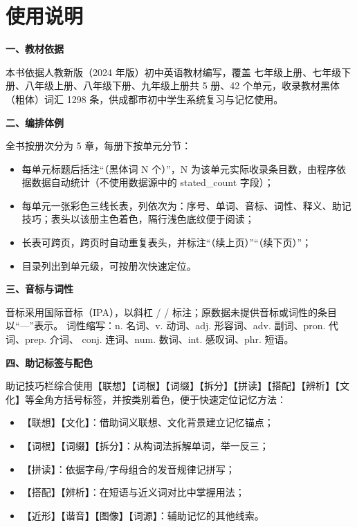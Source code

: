 \documentclass[UTF8,a4paper,11pt,oneside]{ctexbook}
\newcommand{\subhead}[1]{%
  \par\vspace{0.9em}%
  \noindent{\color{mainblue}\rule[-0.18em]{3.2pt}{1.25em}}\hspace{0.55em}%
  {\sffamily\bfseries\large\color{mainblue}#1}\par\vspace{0.28em}}
\begin{document}
\frontmatter
\pagestyle{plain}

\chapter*{使用说明}
{}
\vspace{-0.2em}
\noindent{\color{mainblue!35}\rule{\linewidth}{1.0pt}}\par
\vspace{0.7em}

\subhead{一、教材依据}
本书依据人教新版（2024 年版）初中英语教材编写，覆盖 七年级上册、七年级下册、八年级上册、八年级下册、九年级上册共 5 册、42 个单元，收录教材黑体（粗体）词汇 1298 条，供成都市初中学生系统复习与记忆使用。

\subhead{二、编排体例}
全书按册次分为 5 章，每册下按单元分节：
\begin{itemize}[leftmargin=2.2em,itemsep=0.25ex,topsep=0.3ex,
                label={\textcolor{mainblue}{\small\textbullet}}]
  \item 每单元标题后括注“（黑体词 N 个）”，N 为该单元实际收录条目数，由程序依据数据自动统计（不使用数据源中的 stated\_count 字段）；
  \item 每单元一张彩色三线长表，列依次为：序号、单词、音标、词性、释义、助记技巧；表头以该册主色着色，隔行浅色底纹便于阅读；
  \item 长表可跨页，跨页时自动重复表头，并标注“（续上页）”“（续下页）”；
  \item 目录列出到单元级，可按册次快速定位。
\end{itemize}

\subhead{三、音标与词性}
音标采用国际音标（IPA），以斜杠 / / 标注；原数据未提供音标或词性的条目以“—”表示。
词性缩写：n. 名词、v. 动词、adj. 形容词、adv. 副词、pron. 代词、prep. 介词、
conj. 连词、num. 数词、int. 感叹词、phr. 短语。

\subhead{四、助记标签与配色}
助记技巧栏综合使用【联想】【词根】【词缀】【拆分】【拼读】【搭配】【辨析】【文化】等全角方括号标签，并按类别着色，便于快速定位记忆方法：
\begin{itemize}[leftmargin=2.2em,itemsep=0.25ex,topsep=0.3ex,
                label={\textcolor{mainblue}{\small\textbullet}}]
  \item \textcolor{tagAssoc}{【联想】}\textcolor{tagCult}{【文化】}：借助词义联想、文化背景建立记忆锚点；
  \item \textcolor{tagRoot}{【词根】}\textcolor{tagAffix}{【词缀】}\textcolor{tagSplit}{【拆分】}：从构词法拆解单词，举一反三；
  \item \textcolor{tagSpell}{【拼读】}：依据字母/字母组合的发音规律记拼写；
  \item \textcolor{tagColloc}{【搭配】}\textcolor{tagDist}{【辨析】}：在短语与近义词对比中掌握用法；
  \item \textcolor{tagNear}{【近形】}\textcolor{tagSound}{【谐音】}\textcolor{tagImage}{【图像】}\textcolor{tagEtym}{【词源】}：辅助记忆的其他线索。
\end{itemize}
\end{document}
